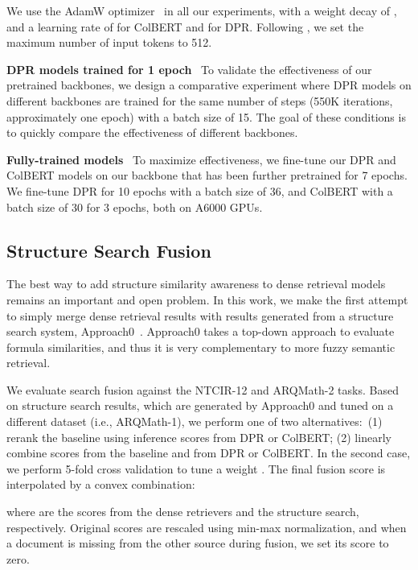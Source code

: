 \documentclass[11pt]{article}
\begin{document}
We use the AdamW optimizer~\cite{loshchilov2017adamW} in all our experiments, with a weight decay of , and a learning rate of  for ColBERT and  for DPR.
Following \citet{reusch2021tu_dbs}, we set the maximum number of input tokens to 512.

\smallskip \noindent
\textbf{DPR models trained for 1 epoch} \  To validate the effectiveness of our pretrained backbones, we design a comparative experiment where DPR models on different backbones are trained for the same number of steps (550K iterations, approximately one epoch) with a batch size of 15.
The goal of these conditions is to quickly compare the effectiveness of different backbones.

\smallskip \noindent
\textbf{Fully-trained models} \ To maximize effectiveness, we fine-tune our DPR and ColBERT models on our backbone that has been further pretrained for 7 epochs.
We fine-tune DPR for 10 epochs with a batch size of 36, and ColBERT with a batch size of 30 for 3 epochs, both on A6000 GPUs.

\subsection{Structure Search Fusion}

The best way to add structure similarity awareness to dense retrieval models remains an important and open problem.
In this work, we make the first attempt to simply merge dense retrieval results with results generated from a structure search system, Approach0~\cite{zhong2019structural,zhong2020accelerating}.
Approach0 takes a top-down approach to evaluate formula similarities, and thus it is very complementary to more fuzzy semantic retrieval.


We evaluate search fusion against the NTCIR-12 and ARQMath-2 tasks.
Based on structure search results, which are generated by Approach0 and tuned on a different dataset (i.e., ARQMath-1), we perform one of two alternatives:\ (1) rerank the baseline using inference scores from DPR or ColBERT;
(2) linearly combine scores from the baseline and from DPR or ColBERT.
In the second case, we perform 5-fold cross validation to tune a weight .
The final fusion score  is interpolated by a convex combination:

\noindent where  are the scores from the dense retrievers and the structure search, respectively.
Original scores are rescaled using min-max normalization, and when a document is missing from the other source during fusion, we set its score to zero.
\end{document}

